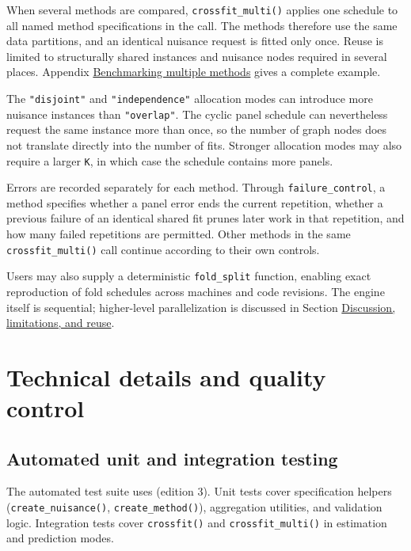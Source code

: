 When several methods are compared, \texttt{crossfit\_multi()} applies one schedule to all named method specifications in the call. The methods therefore use the same data partitions, and an identical nuisance request is fitted only once. Reuse is limited to structurally shared instances and nuisance nodes required in several places. Appendix \hyperref[app:multi]{Benchmarking multiple methods} gives a complete example.

The \texttt{"disjoint"} and \texttt{"independence"} allocation modes can introduce more nuisance instances than \texttt{"overlap"}. The cyclic panel schedule can nevertheless request the same instance more than once, so the number of graph nodes does not translate directly into the number of fits. Stronger allocation modes may also require a larger \texttt{K}, in which case the schedule contains more panels.

Errors are recorded separately for each method. Through \texttt{failure\_control}, a method specifies whether a panel error ends the current repetition, whether a previous failure of an identical shared fit prunes later work in that repetition, and how many failed repetitions are permitted. Other methods in the same \texttt{crossfit\_multi()} call continue according to their own controls.

Users may also supply a deterministic \texttt{fold\_split} function, enabling exact reproduction of fold schedules across machines and code revisions. The engine itself is sequential; higher-level parallelization is discussed in Section \hyperref[sec:discussion]{Discussion, limitations, and reuse}.

\section{Technical details and quality control}\label{sec:technical}

\subsection{Automated unit and integration testing}\label{automated-unit-and-integration-testing}

The automated test suite uses  (edition 3). Unit tests cover specification helpers (\texttt{create\_nuisance()}, \texttt{create\_method()}), aggregation utilities, and validation logic. Integration tests cover \texttt{crossfit()} and \texttt{crossfit\_multi()} in estimation and prediction modes.

